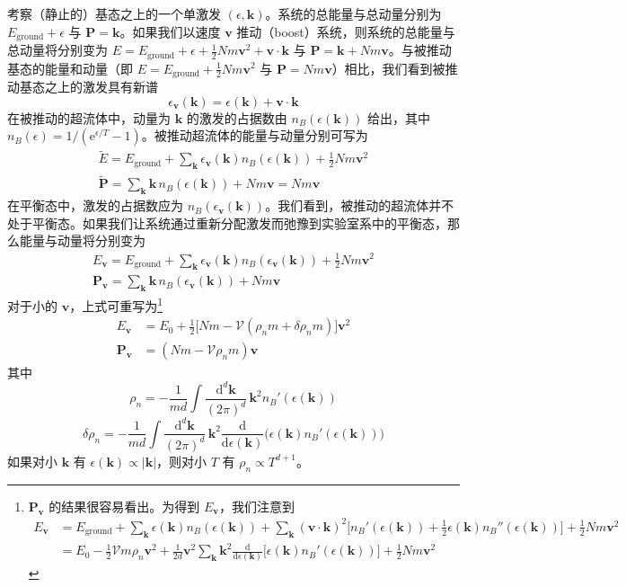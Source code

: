 考察（静止的）基态之上的一个单激发 $(\epsilon,\pmb{k})$。系统的总能量与总动量分别为 $E_{\mathrm{ground}}+\epsilon$ 与 $\pmb{P}=\pmb{k}$。如果我们以速度 $\pmb{v}$ 推动（boost）系统，则系统的总能量与总动量将分别变为 $E=E_{\mathrm{ground}}+\epsilon+\frac{1}{2}Nm\pmb{v}^2+\pmb{v}\cdot\pmb{k}$ 与 $\pmb{P}=\pmb{k}+Nm\pmb{v}$。与被推动基态的能量和动量（即 $E=E_{\mathrm{ground}}+\frac{1}{2}Nm\pmb{v}^2$ 与 $\pmb{P}=Nm\pmb{v}$）相比，我们看到被推动基态之上的激发具有新谱
\begin{equation*}
\epsilon_{\pmb{v}}(\pmb{k})=\epsilon(\pmb{k})+\pmb{v}\cdot\pmb{k}
\end{equation*}
在被推动的超流体中，动量为 $\pmb{k}$ 的激发的占据数由 $n_B(\epsilon(\pmb{k}))$ 给出，其中 $n_B(\epsilon)=1/(\mathrm{e}^{\epsilon/T}-1)$。被推动超流体的能量与动量分别可写为
\begin{gather*}
\tilde{E}=E_{\mathrm{ground}}+\sum_{\pmb{k}}\epsilon_{\pmb{v}}(\pmb{k})n_B(\epsilon(\pmb{k}))+\frac{1}{2}Nm\pmb{v}^2\\
\tilde{\pmb{P}}=\sum_{\pmb{k}}\pmb{k}\,n_B(\epsilon(\pmb{k}))+Nm\pmb{v}=Nm\pmb{v}
\end{gather*}
在平衡态中，激发的占据数应为 $n_B(\epsilon_{\pmb{v}}(\pmb{k}))$。我们看到，被推动的超流体并不处于平衡态。如果我们让系统通过重新分配激发而弛豫到实验室系中的平衡态，那么能量与动量将分别变为
\begin{gather*}
E_{\pmb{v}}=E_{\mathrm{ground}}+\sum_{\pmb{k}}\epsilon_{\pmb{v}}(\pmb{k})n_B(\epsilon_{\pmb{v}}(\pmb{k}))+\frac{1}{2}Nm\pmb{v}^2\\
\pmb{P}_{\pmb{v}}=\sum_{\pmb{k}}\pmb{k}\,n_B(\epsilon_{\pmb{v}}(\pmb{k}))+Nm\pmb{v}
\end{gather*}
对于小的 $\pmb{v}$，上式可重写为\footnote{$\pmb{P}_{\pmb{v}}$ 的结果很容易看出。为得到 $E_{\pmb{v}}$，我们注意到
\begin{align*}
E_{\pmb{v}}&=E_{\mathrm{ground}}+\sum_{\pmb{k}}\epsilon(\pmb{k})n_B(\epsilon(\pmb{k}))+\sum_{\pmb{k}}(\pmb{v}\cdot\pmb{k})^2\big[n_B'(\epsilon(\pmb{k}))+\tfrac{1}{2}\epsilon(\pmb{k})n_B''(\epsilon(\pmb{k}))\big]+\frac{1}{2}Nm\pmb{v}^2\\
&=E_0-\frac{1}{2}\mathcal{V}m\rho_n\pmb{v}^2+\frac{1}{2d}\pmb{v}^2\sum_{\pmb{k}}\pmb{k}^2\frac{\mathrm{d}}{\mathrm{d}\epsilon(\pmb{k})}\big[\epsilon(\pmb{k})n_B'(\epsilon(\pmb{k}))\big]+\frac{1}{2}Nm\pmb{v}^2
\end{align*}}
\begin{align*}
E_{\pmb{v}}&=E_0+\frac{1}{2}\big[Nm-\mathcal{V}(\rho_nm+\delta\rho_nm)\big]\pmb{v}^2\\
\pmb{P}_{\pmb{v}}&=(Nm-\mathcal{V}\rho_nm)\pmb{v} \tag{3.7.12}
\end{align*}
其中
\begin{equation*}
\rho_n=-\frac{1}{md}\int\frac{\mathrm{d}^d\pmb{k}}{(2\pi)^d}\,\pmb{k}^2n_B'(\epsilon(\pmb{k})) \tag{3.7.13}
\end{equation*}
\begin{equation*}
\delta\rho_n=-\frac{1}{md}\int\frac{\mathrm{d}^d\pmb{k}}{(2\pi)^d}\,\pmb{k}^2\frac{\mathrm{d}}{\mathrm{d}\epsilon(\pmb{k})}\big(\epsilon(\pmb{k})n_B'(\epsilon(\pmb{k}))\big) \tag{3.7.14}
\end{equation*}
如果对小 $\pmb{k}$ 有 $\epsilon(\pmb{k})\propto|\pmb{k}|$，则对小 $T$ 有 $\rho_n\propto T^{d+1}$。

